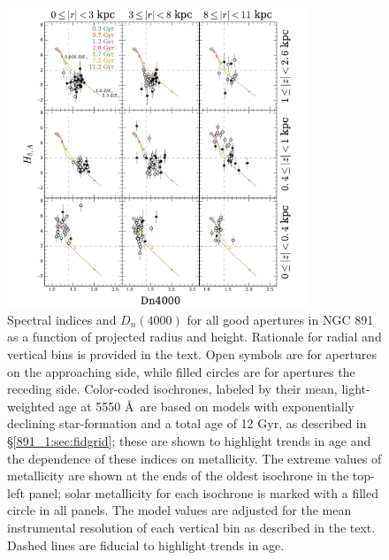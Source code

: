 \begin{figure}[t]
  \centering
  \includegraphics[width=0.8\textwidth]{891_1/figs/Dn4000_multires.pdf}
  \caption{\label{fig:D4000_cuts}\fixspacing Spectral indices \Hda and
    $D_n(4000)$ for all good apertures in NGC 891 as a function of
    projected radius and height. Rationale for radial and vertical
    bins is provided in the text. Open symbols are for apertures on
    the approaching side, while filled circles are for apertures the
    receding side. Color-coded isochrones, labeled by their mean,
    light-weighted age at 5550 \AA\ are based on models with
    exponentially declining star-formation and a total age of 12 Gyr,
    as described in \S\ref{891_1:sec:fidgrid}; these are shown to highlight
    trends in age and the dependence of these indices on
    metallicity. The extreme values of metallicity are shown at the
    ends of the oldest isochrone in the top-left panel; solar
    metallicity for each isochrone is marked with a filled circle in
    all panels. The model values are adjusted for the mean
    instrumental resolution of each vertical bin as described in the
    text. Dashed lines are fiducial to highlight trends in age.}
\end{figure}

